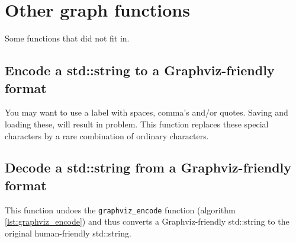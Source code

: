 \chapter{Other graph functions}
\label{sec:Other-graph-functions}

Some functions that did not fit in.

\section{Encode a std::string to a Graphviz-friendly format}
\label{subsec:graphviz_encode}

You may want to use a label with spaces, comma's and/or quotes.
Saving and loading these, will result in problem.
This function replaces these special characters by a rare combination of
ordinary characters.



\section{Decode a std::string from a Graphviz-friendly format}
\label{subsec:graphviz_decode}

This function undoes the \verb;graphviz_encode; function (algorithm 
\ref{lst:graphviz_encode}) and thus converts a 
Graphviz-friendly std::string to the original human-friendly std::string.



